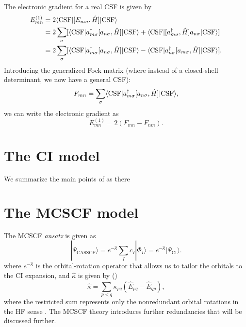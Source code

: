 \documentclass{article}
\begin{document}
The electronic gradient for a real CSF is given by 
\begin{align}
E_{mn}^{(1)}&=2\langle\mathrm{CSF}|[E_{mn},\hat{H}]|\mathrm{CSF}\rangle\\
&=2\sum_{\sigma}[\langle\mathrm{CSF}|a_{m\sigma}^{\dagger}[a_{n\sigma},\hat{H}]|\mathrm{CSF}\rangle+\langle\mathrm{CSF}|[a_{m\sigma}^{\dagger},\hat{H}]a_{n\sigma}|\mathrm{CSF}\rangle]\\
&=2\sum_{\sigma}[\langle\mathrm{CSF}|a_{m\sigma}^{\dagger}[a_{n\sigma},\hat{H}]|\mathrm{CSF}\rangle-\langle\mathrm{CSF}|a_{n\sigma}^{\dagger}[a_{m\sigma},\hat{H}]|\mathrm{CSF}\rangle].
\end{align}
Introducing the generalized Fock matrix (where instead of a closed-shell determinant, we now have a general CSF):
\begin{equation}
F_{mn}=\sum_{\sigma}\langle\mathrm{CSF}|a_{m\sigma}^{\dagger}[a_{n\sigma},\hat{H}]|\mathrm{CSF}\rangle,
\end{equation}
we can write the electronic gradient as 
\begin{equation}
E_{mn}^{(1)}=2(F_{mn}-F_{nm}).
\end{equation}

\section{The CI model}
We summarize the main points of \cite[Ch. 11]{helgakerMolecularElectronicStructure2000} as there 

\section{The MCSCF model}
The MCSCF \textit{ansatz} is given as
\begin{equation}
    |\Psi_{\mathrm{CASSCF}}\rangle= e^{-\hat{\kappa}} \sum_I c_I|\Phi_I\rangle= e^{-\hat{\kappa}}|\Psi_{\mathrm{CI}}\rangle.
\end{equation}
where $e^{-\hat{\kappa}}$ is the orbital-rotation operator that allows us to tailor the orbitals to the CI expansion, and $\hat{\kappa}$ is given by (\cite[eq. 3.3.22]{helgakerMolecularElectronicStructure2000})
\begin{equation}
    \hat{\kappa}=\sum_{p<q}\kappa_{pq}(\hat{E}_{pq}-\hat{E}_{qp}),
\end{equation}
where the restricted sum represents only the nonredundant orbital rotations in the HF sense \cite[Ch. 10.1.2]{helgakerMolecularElectronicStructure2000}. The MCSCF theory introduces further redundancies that will be discussed further.
\end{document}
